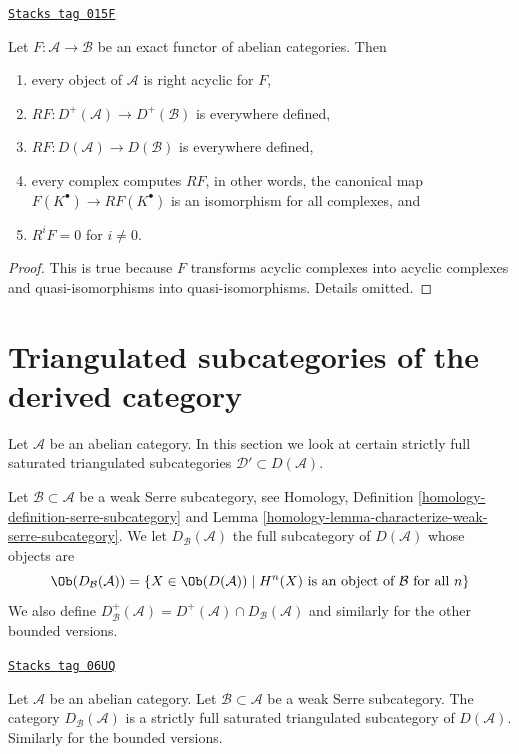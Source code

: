 \begin{lemma}
\label{derived-lemma-right-derived-exact-functor}
\href{https://stacks.math.columbia.edu/tag/015F}{\texttt{Stacks tag 015F}}

Let $F : \mathcal{A} \to \mathcal{B}$ be an exact functor of
abelian categories. Then
\begin{enumerate}
\item every object of $\mathcal{A}$ is right acyclic for $F$,
\item $RF : D^{+}(\mathcal{A}) \to D^{+}(\mathcal{B})$ is everywhere defined,
\item $RF : D(\mathcal{A}) \to D(\mathcal{B})$ is everywhere defined,
\item every complex computes $RF$, in other words, the canonical
map $F(K^\bullet) \to RF(K^\bullet)$ is an isomorphism for all complexes, and
\item $R^iF = 0$ for $i \not = 0$.
\end{enumerate}
\end{lemma}

\begin{proof}
This is true because $F$ transforms acyclic complexes into acyclic complexes
and quasi-isomorphisms into quasi-isomorphisms. Details omitted.
\end{proof}

\section{Triangulated subcategories of the derived category}
\label{derived-section-triangulated-sub}
Let $\mathcal{A}$ be an abelian category. In this section we look at
certain strictly full saturated triangulated subcategories
$\mathcal{D}' \subset D(\mathcal{A})$.

\medskip\noindent
Let $\mathcal{B} \subset \mathcal{A}$ be a weak Serre subcategory, see
Homology, Definition \ref{homology-definition-serre-subcategory} and
Lemma \ref{homology-lemma-characterize-weak-serre-subcategory}.
We let $D_\mathcal{B}(\mathcal{A})$ the full subcategory of
$D(\mathcal{A})$ whose objects are
$$
\Ob(D_\mathcal{B}(\mathcal{A}))
=
\{X \in \Ob(D(\mathcal{A})) \mid
H^n(X) \text{ is an object of }\mathcal{B}\text{ for all }n\}
$$
We also define
$D^{+}_\mathcal{B}(\mathcal{A}) =
D^{+}(\mathcal{A}) \cap D_\mathcal{B}(\mathcal{A})$
and similarly for the other bounded versions.

\begin{lemma}
\label{derived-lemma-cohomology-in-serre-subcategory}
\href{https://stacks.math.columbia.edu/tag/06UQ}{\texttt{Stacks tag 06UQ}}

Let $\mathcal{A}$ be an abelian category.
Let $\mathcal{B} \subset \mathcal{A}$ be a weak Serre subcategory.
The category $D_\mathcal{B}(\mathcal{A})$ is a strictly full
saturated triangulated subcategory of $D(\mathcal{A})$.
Similarly for the bounded versions.
\end{lemma}

